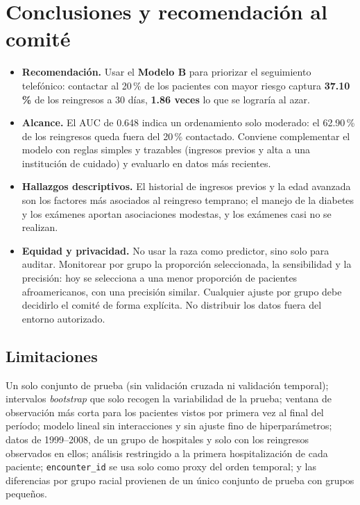\documentclass[11pt,a4paper]{article}
\newcommand{\cod}[1]{\texttt{#1}}
\begin{document}
\section{Conclusiones y recomendación al comité}
\begin{itemize}
\item \textbf{Recomendación.} Usar el \textbf{Modelo B} para priorizar el seguimiento telefónico: contactar al 20\,\% de los pacientes con mayor riesgo captura \textbf{37.10\,\%} de los reingresos a 30 días, \textbf{1.86 veces} lo que se lograría al azar.
\item \textbf{Alcance.} El AUC de 0.648 indica un ordenamiento solo moderado: el 62.90\,\% de los reingresos queda fuera del 20\,\% contactado. Conviene complementar el modelo con reglas simples y trazables (ingresos previos y alta a una institución de cuidado) y evaluarlo en datos más recientes.
\item \textbf{Hallazgos descriptivos.} El historial de ingresos previos y la edad avanzada son los factores más asociados al reingreso temprano; el manejo de la diabetes y los exámenes aportan asociaciones modestas, y los exámenes casi no se realizan.
\item \textbf{Equidad y privacidad.} No usar la raza como predictor, sino solo para auditar. Monitorear por grupo la proporción seleccionada, la sensibilidad y la precisión: hoy se selecciona a una menor proporción de pacientes afroamericanos, con una precisión similar. Cualquier ajuste por grupo debe decidirlo el comité de forma explícita. No distribuir los datos fuera del entorno autorizado.
\end{itemize}

\subsection*{Limitaciones}
Un solo conjunto de prueba (sin validación cruzada ni validación temporal); intervalos \emph{bootstrap} que solo recogen la variabilidad de la prueba; ventana de observación más corta para los pacientes vistos por primera vez al final del período; modelo lineal sin interacciones y sin ajuste fino de hiperparámetros; datos de 1999--2008, de un grupo de hospitales y solo con los reingresos observados en ellos; análisis restringido a la primera hospitalización de cada paciente; \cod{encounter\_id} se usa solo como proxy del orden temporal; y las diferencias por grupo racial provienen de un único conjunto de prueba con grupos pequeños.
\end{document}
